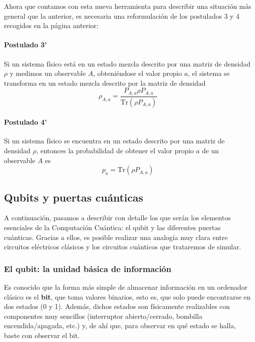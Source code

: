 \documentclass[11pt,a4paper,twoside,pdf]{article}
\numberwithin{equation}{section}
\begin{document}
		Ahora que contamos con esta nueva herramienta para describir una situación más general que la anterior, es necesaria una reformulación de los postulados 3 y 4 recogidos en la página anterior:
		\paragraph{Postulado 3'} \label{Par: Postulado 3.2}
			Si un sistema físico está en un estado mezcla descrito por una matriz de densidad $\rho$ y medimos un observable $A$, obteniéndose el valor propio $a$, el sistema se transforma en un estado mezcla descrito por la matriz de densidad
			\begin{equation}
					\rho_{A,a}=\frac{P_{A,a}\rho P_{A,a}}{\text{Tr}(\rho P_{A,a})}
			\end{equation} 
		
		\paragraph{Postulado 4'} \label{Par: Postulado 4.2}
			Si un sistema físico se encuentra en un estado descrito por una matriz de densidad $\rho$, entonces la probabilidad de obtener el valor propio $a$ de un observable $A$ es
			\begin{equation}
				p_a = \text{Tr}(\rho P_{A,a})
			\end{equation}
				
			
	\subsection{Qubits y puertas cuánticas}
		
	A continuación, pasamos a describir con detalle los que serán los elementos esenciales de la Computación Cuántica: el qubit y las diferentes puertas cuánticas. Gracias a ellos, es posible realizar una analogía muy clara entre circuitos eléctricos clásicos y los circuitos cuánticos que trataremos de simular.
						
		\subsubsection{El qubit: la unidad básica de información}
			
		Es conocido que la forma más simple de almacenar información en un ordenador clásico es el \textbf{bit}, que toma valores binarios, esto es, que solo puede encontrarse en dos estados (0 y 1). Además, dichos estados son físicamente realizables con componentes muy sencillos (interruptor abierto/cerrado, bombilla encendida/apagada, etc.) y, de ahí que, para observar en qué estado se halla, baste con observar el bit. 
				
\end{document}
